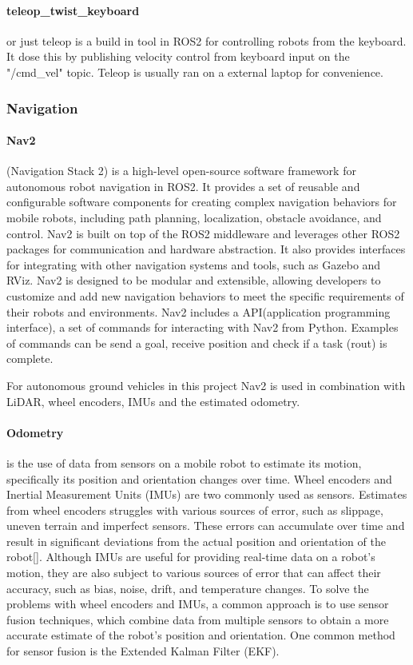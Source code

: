 \paragraph{teleop\_twist\_keyboard} or just teleop is a build in tool in ROS2 for controlling robots from the keyboard. It dose this by publishing velocity control from keyboard input on the "/cmd\_vel" topic. Teleop is usually ran on a external laptop for convenience.   

\subsubsection{Navigation} 

\paragraph{Nav2} (Navigation Stack 2) \cite{rosnavigation} is a high-level open-source software framework for autonomous robot navigation in ROS2. It provides a set of reusable and configurable software components for creating complex navigation behaviors for mobile robots, including path planning, localization, obstacle avoidance, and control. Nav2 is built on top of the ROS2 middleware and leverages other ROS2 packages for communication and hardware abstraction. It also provides interfaces for integrating with other navigation systems and tools, such as Gazebo and RViz. Nav2 is designed to be modular and extensible, allowing developers to customize and add new navigation behaviors to meet the specific requirements of their robots and environments.
Nav2 includes a API(application programming interface)\cite{rosnavAPI}, a set of commands for interacting with Nav2 from Python. Examples of commands can be send a goal, receive position and check if a task (rout) is complete.  

For autonomous ground vehicles in this project Nav2 is used in combination with LiDAR, wheel encoders, IMUs and the estimated odometry. 

\paragraph{Odometry} is the use of data from sensors on a mobile robot to estimate its motion, specifically its position and orientation changes over time. Wheel encoders and Inertial Measurement Units (IMUs) are two commonly used as sensors. Estimates from wheel encoders struggles with various sources of error, such as slippage, uneven terrain and imperfect sensors. These errors can accumulate over time and result in significant deviations from the actual position and orientation of the robot[]. Although IMUs are useful for providing real-time data on a robot's motion, they are also subject to various sources of error that can affect their accuracy, such as bias, noise, drift, and temperature changes. 
To solve the problems with wheel encoders and IMUs, a common approach is to use sensor fusion techniques, which combine data from multiple sensors to obtain a more accurate estimate of the robot's position and orientation. One common method for sensor fusion is the Extended Kalman Filter (EKF). 

